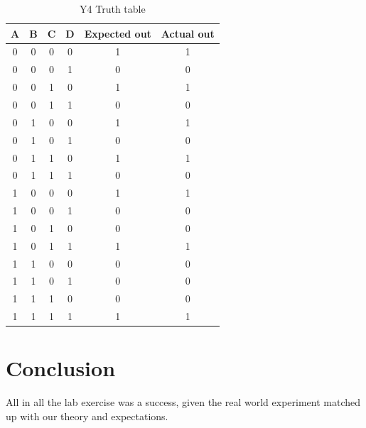 \documentclass{article}
\begin{document}
\begin{table}[h]
    \begin{center}
    \caption{Y4 Truth table}\label{tab:table1}\hypertarget{Y4Table}{\space}
    \vspace{3pt}
    \begin{tabular}{|c|c|c|c||c|c|}
      \hline A & B & C & D & Expected out & Actual out\\
      \hline \hline 0 & 0 & 0 & 0 & 1 & 1\\
      \hline 0 & 0 & 0 & 1 & 0 & 0\\
      \hline 0 & 0 & 1 & 0 & 1 & 1\\
      \hline 0 & 0 & 1 & 1 & 0 & 0\\
      \hline 0 & 1 & 0 & 0 & 1 & 1\\
      \hline 0 & 1 & 0 & 1 & 0 & 0\\
      \hline 0 & 1 & 1 & 0 & 1 & 1\\
      \hline 0 & 1 & 1 & 1 & 0 & 0\\
      \hline 1 & 0 & 0 & 0 & 1 & 1\\
      \hline 1 & 0 & 0 & 1 & 0 & 0\\
      \hline 1 & 0 & 1 & 0 & 0 & 0\\
      \hline 1 & 0 & 1 & 1 & 1 & 1\\
      \hline 1 & 1 & 0 & 0 & 0 & 0\\
      \hline 1 & 1 & 0 & 1 & 0 & 0\\
      \hline 1 & 1 & 1 & 0 & 0 & 0\\
      \hline 1 & 1 & 1 & 1 & 1 & 1\\
      \hline
  \end{tabular}
\end{center}
\end{table}

\pagebreak


\section*{Conclusion}

 \addtocounter{section}{1}
All in all the lab exercise was a success, given the real world experiment matched up with our theory and expectations.

\vspace{3mm}
\end{document}
